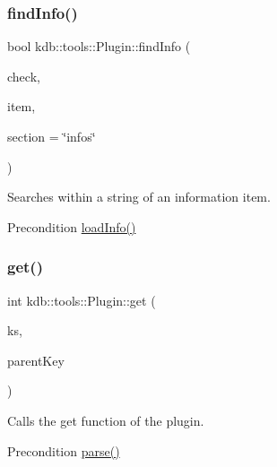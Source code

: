 \subsubsection{\texorpdfstring{find\+Info()}{findInfo()}}
{\footnotesize\ttfamily bool kdb\+::tools\+::\+Plugin\+::find\+Info (\begin{DoxyParamCaption}\item[{std\+::string}]{check,  }\item[{std\+::string}]{item,  }\item[{std\+::string}]{section = {\ttfamily \char`\"{}infos\char`\"{}} }\end{DoxyParamCaption})}



Searches within a string of an information item. 

\begin{DoxyPrecond}{Precondition}
\hyperlink{classkdb_1_1tools_1_1Plugin_a3a0c6a956d1714002ef9baf8c9d99167}{load\+Info()} 
\end{DoxyPrecond}
\mbox{\label{classkdb_1_1tools_1_1Plugin_a2aa6ff55f9cf81a59d2a8d271fe68e0f}} 
\subsubsection{\texorpdfstring{get()}{get()}}
{\footnotesize\ttfamily int kdb\+::tools\+::\+Plugin\+::get (\begin{DoxyParamCaption}\item[{\hyperlink{classkdb_1_1KeySet}{kdb\+::\+Key\+Set} \&}]{ks,  }\item[{\hyperlink{classkdb_1_1Key}{kdb\+::\+Key} \&}]{parent\+Key }\end{DoxyParamCaption})}



Calls the get function of the plugin. 

\begin{DoxyPrecond}{Precondition}
\hyperlink{classkdb_1_1tools_1_1Plugin_adfcba2fbdeb436a1083410df804d5fb0}{parse()} 
\end{DoxyPrecond}
\mbox{\label{classkdb_1_1tools_1_1Plugin_af3004444f5ef05dc8106646ff2b95694}} 
